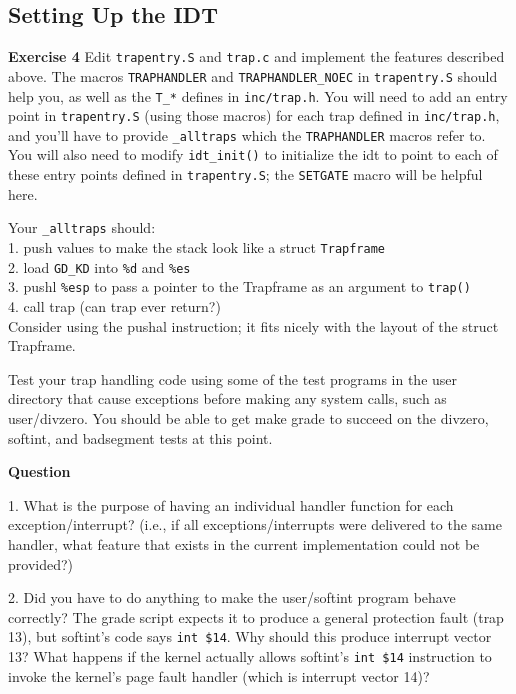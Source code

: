 \documentclass[11pt]{article}
\begin{document}
\subsection{Setting Up the IDT}
\begin{framed}
\noindent\textbf{Exercise 4} Edit \lstinline|trapentry.S| and \lstinline|trap.c| and implement the features described above. The macros \lstinline|TRAPHANDLER| and \lstinline|TRAPHANDLER_NOEC| in \lstinline|trapentry.S| should help you, as well as the \lstinline|T_*| defines in \lstinline|inc/trap.h|. You will need to add an entry point in \lstinline|trapentry.S| (using those macros) for each trap defined in \lstinline|inc/trap.h|, and you'll have to provide \lstinline|_alltraps| which the \lstinline|TRAPHANDLER| macros refer to. You will also need to modify \lstinline|idt_init()| to initialize the idt to point to each of these entry points defined in \lstinline|trapentry.S|; the \lstinline|SETGATE| macro will be helpful here.

Your \lstinline|_alltraps| should:
\\
1. push values to make the stack look like a struct \lstinline|Trapframe| \\
2. load \lstinline|GD_KD| into \lstinline|%d| and \lstinline|%es| \\
3. pushl \lstinline|%esp| to pass a pointer to the Trapframe as an argument to \lstinline|trap()| \\
4. call trap (can trap ever return?) \\

Consider using the pushal instruction; it fits nicely with the layout of the struct Trapframe.

Test your trap handling code using some of the test programs in the user directory that cause exceptions before making any system calls, such as user/divzero. You should be able to get make grade to succeed on the divzero, softint, and badsegment tests at this point. 
\end{framed}

\begin{framed}
\noindent\textbf{Question}

1. What is the purpose of having an individual handler function for each exception/interrupt? (i.e., if all exceptions/interrupts were delivered to the same handler, what feature that exists in the current implementation could not be provided?)

2. Did you have to do anything to make the user/softint program behave correctly? The grade script expects it to produce a general protection fault (trap 13), but softint's code says \lstinline|int $14|. Why should this produce interrupt vector 13? What happens if the kernel actually allows softint's \lstinline|int $14| instruction to invoke the kernel's page fault handler (which is interrupt vector 14)?
\end{framed}
\end{document}
